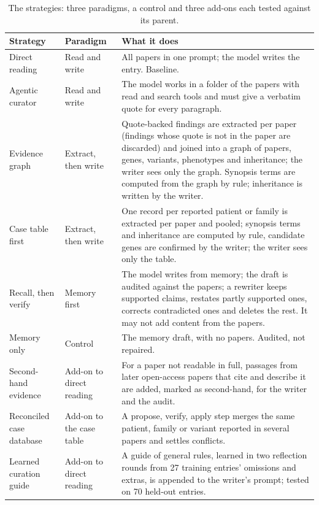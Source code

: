 \documentclass{article} %
\begin{document}
\begin{table}[!htbp]
\caption{The strategies: three paradigms, a control and three add-ons each tested against its parent.}
\label{tab:app_strategies}
\scriptsize
\begin{tabularx}{\linewidth}{>{\raggedright\arraybackslash}p{2.4cm}>{\centering\arraybackslash}X>{\centering\arraybackslash}X}
\toprule
Strategy & Paradigm & What it does \\
\midrule
Direct reading & Read and write & All papers in one prompt; the model writes the entry. Baseline. \\
Agentic curator & Read and write & The model works in a folder of the papers with read and search tools and must give a verbatim quote for every paragraph. \\
Evidence graph & Extract, then write & Quote-backed findings are extracted per paper (findings whose quote is not in the paper are discarded) and joined into a graph of papers, genes, variants, phenotypes and inheritance; the writer sees only the graph. Synopsis terms are computed from the graph by rule; inheritance is written by the writer. \\
Case table first & Extract, then write & One record per reported patient or family is extracted per paper and pooled; synopsis terms and inheritance are computed by rule, candidate genes are confirmed by the writer; the writer sees only the table. \\
Recall, then verify & Memory first & The model writes from memory; the draft is audited against the papers; a rewriter keeps supported claims, restates partly supported ones, corrects contradicted ones and deletes the rest. It may not add content from the papers. \\
Memory only & Control & The memory draft, with no papers. Audited, not repaired. \\
Second-hand evidence & Add-on to direct reading & For a paper not readable in full, passages from later open-access papers that cite and describe it are added, marked as second-hand, for the writer and the audit. \\
Reconciled case database & Add-on to the case table & A propose, verify, apply step merges the same patient, family or variant reported in several papers and settles conflicts. \\
Learned curation guide & Add-on to direct reading & A guide of general rules, learned in two reflection rounds from 27 training entries' omissions and extras, is appended to the writer's prompt; tested on 70 held-out entries. \\
\bottomrule
\end{tabularx}
\end{table}
\end{document}
